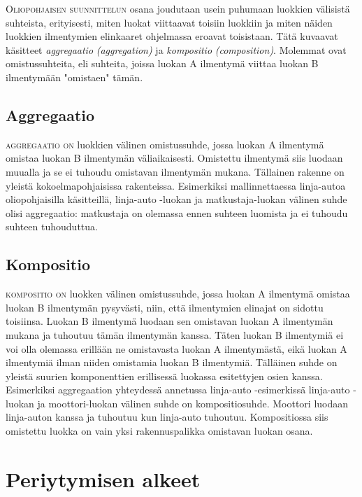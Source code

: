 \documentclass[openany]{book}
\newcommand{\newthought}[1]{\smallskip\textsc{#1}}
\newcommand{\eng}[1]{\textit{(#1)}}
\newcommand{\new}[1]{\textit{\gls{#1}}}
\newcommand{\neweng}[2]{\new{#1} \eng{#2}}
\begin{document}
\newthought{Oliopohjaisen suunnittelun} osana joudutaan usein puhumaan luokkien välisistä
suhteista, erityisesti, miten luokat viittaavat toisiin luokkiin ja miten näiden luokkien
ilmentymien elinkaaret ohjelmassa eroavat toisistaan. Tätä kuvaavat käsitteet
\neweng{aggregaatio}{aggregation} ja \neweng{kompositio}{composition}. Molemmat ovat
omistussuhteita, eli suhteita, joissa luokan A ilmentymä viittaa luokan B ilmentymään "omistaen"
tämän.

\subsection{Aggregaatio}
\label{aggregaatio}

\newthought{\Gls{aggregaatio} on} luokkien välinen omistussuhde, jossa luokan A ilmentymä omistaa
luokan B ilmentymän väliaikaisesti. Omistettu ilmentymä siis luodaan muualla ja se ei tuhoudu
omistavan ilmentymän mukana. Tällainen rakenne on yleistä kokoelmapohjaisissa rakenteissa.
Esimerkiksi mallinnettaessa linja-autoa oliopohjaisilla käsitteillä, linja-auto -luokan ja
matkustaja-luokan välinen suhde olisi aggregaatio: matkustaja on olemassa ennen suhteen luomista
ja ei tuhoudu suhteen tuhouduttua.

\subsection{Kompositio}
\label{kompositio}

\newthought{\Gls{kompositio} on} luokken välinen omistussuhde, jossa luokan A ilmentymä omistaa
luokan B ilmentymän pysyvästi, niin, että ilmentymien elinajat on sidottu toisiinsa. Luokan B
ilmentymä luodaan sen omistavan luokan A ilmentymän mukana ja tuhoutuu tämän ilmentymän kanssa.
Täten luokan B ilmentymiä ei voi olla olemassa erillään ne omistavasta luokan A ilmentymästä,
eikä luokan A ilmentymiä ilman niiden omistamia luokan B ilmentymiä. Tälläinen suhde on yleistä
suurien komponenttien erillisessä luokassa esitettyjen osien kanssa. Esimerkiksi aggregaation
yhteydessä annetussa linja-auto -esimerkissä linja-auto -luokan ja moottori-luokan välinen suhde
on kompositiosuhde. Moottori luodaan linja-auton kanssa ja tuhoutuu kun linja-auto tuhoutuu.
Kompositiossa siis omistettu luokka on vain yksi rakennuspalikka omistavan luokan osana.


\section{Periytymisen alkeet}
\label{periytyminen1}
\end{document}
